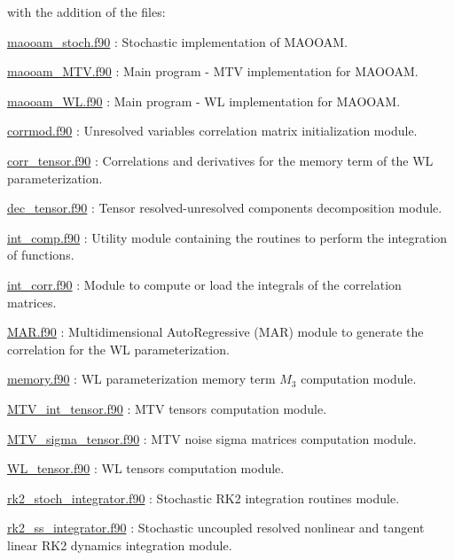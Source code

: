 with the addition of the files\+:


\begin{DoxyItemize}
\item \hyperlink{maooam__stoch_8f90}{maooam\+\_\+stoch.\+f90} \+: Stochastic implementation of M\+A\+O\+O\+AM.
\item \hyperlink{maooam__MTV_8f90}{maooam\+\_\+\+M\+T\+V.\+f90} \+: Main program -\/ M\+TV implementation for M\+A\+O\+O\+AM.
\item \hyperlink{maooam__WL_8f90}{maooam\+\_\+\+W\+L.\+f90} \+: Main program -\/ WL implementation for M\+A\+O\+O\+AM.
\item \hyperlink{corrmod_8f90}{corrmod.\+f90} \+: Unresolved variables correlation matrix initialization module.
\item \hyperlink{corr__tensor_8f90}{corr\+\_\+tensor.\+f90} \+: Correlations and derivatives for the memory term of the WL parameterization.
\item \hyperlink{dec__tensor_8f90}{dec\+\_\+tensor.\+f90} \+: Tensor resolved-\/unresolved components decomposition module.
\item \hyperlink{int__comp_8f90}{int\+\_\+comp.\+f90} \+: Utility module containing the routines to perform the integration of functions.
\item \hyperlink{int__corr_8f90}{int\+\_\+corr.\+f90} \+: Module to compute or load the integrals of the correlation matrices.
\item \hyperlink{MAR_8f90}{M\+A\+R.\+f90} \+: Multidimensional Auto\+Regressive (M\+AR) module to generate the correlation for the WL parameterization.
\item \hyperlink{memory_8f90}{memory.\+f90} \+: WL parameterization memory term $M_3$ computation module.
\item \hyperlink{MTV__int__tensor_8f90}{M\+T\+V\+\_\+int\+\_\+tensor.\+f90} \+: M\+TV tensors computation module.
\item \hyperlink{MTV__sigma__tensor_8f90}{M\+T\+V\+\_\+sigma\+\_\+tensor.\+f90} \+: M\+TV noise sigma matrices computation module.
\item \hyperlink{WL__tensor_8f90}{W\+L\+\_\+tensor.\+f90} \+: WL tensors computation module.
\item \hyperlink{rk2__stoch__integrator_8f90}{rk2\+\_\+stoch\+\_\+integrator.\+f90} \+: Stochastic R\+K2 integration routines module.
\item \hyperlink{rk2__ss__integrator_8f90}{rk2\+\_\+ss\+\_\+integrator.\+f90} \+: Stochastic uncoupled resolved nonlinear and tangent linear R\+K2 dynamics integration module.

\end{DoxyItemize}

